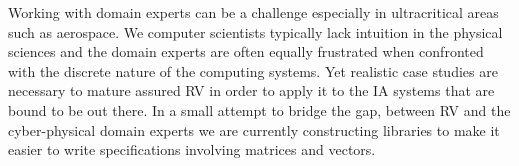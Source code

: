  Working with domain experts can be a challenge especially in
 ultracritical areas such as aerospace.  We computer scientists
 typically lack intuition in the physical sciences and the domain
 experts are often equally frustrated when confronted with the
 discrete nature of the computing systems. Yet realistic case studies
 are necessary to mature assured RV in order to apply it to the  IA
 systems that are bound to be out there. In a small attempt to bridge
 the gap, between RV and the cyber-physical domain experts we
 are currently  constructing libraries to make it easier to write
 specifications involving matrices and vectors.  

 












